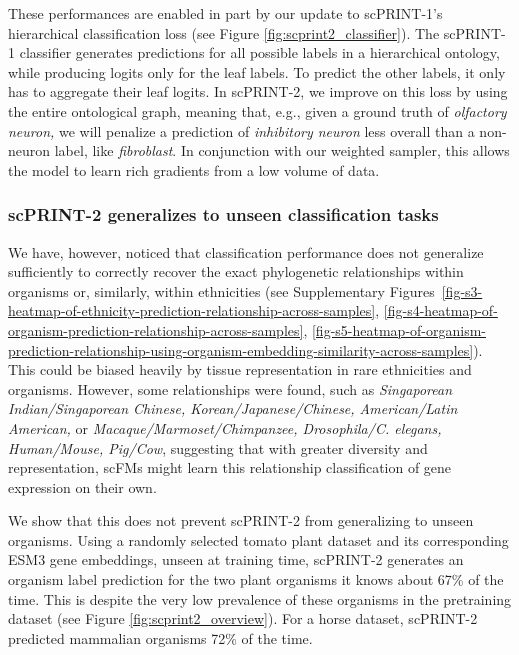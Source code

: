 These performances are enabled in part by our update to scPRINT-1's
hierarchical classification loss (see Figure \ref{fig:scprint2_classifier}). The scPRINT-1
classifier generates predictions for all possible labels in a
hierarchical ontology, while producing logits only for the leaf labels.
To predict the other labels, it only has to aggregate their leaf logits.
In \gls{scPRINT}-2, we improve on this loss by using the entire ontological
graph, meaning that, e.g., given a ground truth of \emph{olfactory
neuron,} we will penalize a prediction of \emph{inhibitory neuron} less
overall than a non-neuron label, like \emph{fibroblast}. In conjunction
with our weighted sampler, this allows the model to learn rich gradients
from a low volume of data.

\subsubsection{\gls{scPRINT}-2 generalizes to unseen classification
tasks}\label{scprint-2-generalizes-to-unseen-classification-tasks}

We have, however, noticed that classification performance does not
generalize sufficiently to correctly recover the exact phylogenetic
relationships within organisms or, similarly, within ethnicities (see
Supplementary Figures~\ref{fig-s3-heatmap-of-ethnicity-prediction-relationship-across-samples}, \ref{fig-s4-heatmap-of-organism-prediction-relationship-across-samples}, \ref{fig-s5-heatmap-of-organism-prediction-relationship-using-organism-embedding-similarity-across-samples}). This could be biased heavily by tissue
representation in rare ethnicities and organisms. However, some
relationships were found, such as \emph{Singaporean Indian/Singaporean
Chinese, Korean/Japanese/Chinese, American/Latin American,} or
\emph{Macaque/Marmoset/Chimpanzee, Drosophila/C. elegans, Human/Mouse,
Pig/Cow}, suggesting that with greater diversity and representation,
\gls{scFM}s might learn this relationship classification of gene expression on
their own.

We show that this does not prevent \gls{scPRINT}-2 from generalizing to unseen
organisms. Using a randomly selected tomato plant dataset and its
corresponding ESM3 gene embeddings, unseen at training time, \gls{scPRINT}-2
generates an organism label prediction for the two plant organisms it
knows about 67\% of the time. This is despite the very low prevalence of
these organisms in the pretraining dataset (see Figure \ref{fig:scprint2_overview}). For a horse
dataset, \gls{scPRINT}-2 predicted mammalian organisms 72\% of the time.

